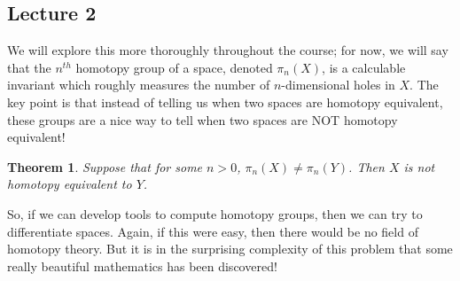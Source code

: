 \documentclass[10pt]{amsart}
\newtheorem{thm}{Theorem}[section]
\theoremstyle{definition}
\begin{document}
\subsection*{Lecture 2}
\hfill

We will explore this more thoroughly throughout the course; for now, we will say that the $n^{th}$ homotopy group of a space, denoted $\pi_n(X)$, is a calculable invariant which roughly measures the number of $n$-dimensional holes in $X$. The key point is that instead of telling us when two spaces are homotopy equivalent, these groups are a nice way to tell when two spaces are NOT homotopy equivalent! 
\begin{thm}
    Suppose that for some $n >0$, $\pi_n(X) \neq \pi_n(Y)$. Then $X$ is not homotopy equivalent to $Y$.
\end{thm}
So, if we can develop tools to compute homotopy groups, then we can try to differentiate spaces. Again, if this were easy, then there would be no field of homotopy theory. But it is in the surprising complexity of this problem that some really beautiful mathematics has been discovered! 
\end{document}
